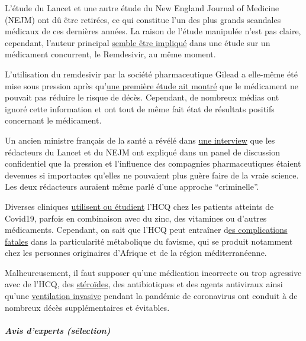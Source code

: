 L'étude du Lancet et une autre étude du New England Journal of Medicine
(NEJM) ont dû être retirées, ce qui constitue l'un des plus grands
scandales médicaux de ces dernières années. La raison de l'étude
manipulée n'est pas claire, cependant, l'auteur principal
\href{https://www.medicineuncensored.com/a-study-out-of-thin-air}{semble
être impliqué} dans une étude sur un médicament concurrent, le
Remdesivir, au même moment.

L'utilisation du remdesivir par la société pharmaceutique Gilead a
elle-même été mise sous pression après
qu'\href{https://edition.cnn.com/2020/05/22/health/remdesivir-covid-19-trial-results-nejm-study/index.html}{une
première étude ait montré} que le médicament ne pouvait pas réduire le
risque de décès. Cependant, de nombreux médias ont ignoré cette
information et ont tout de même fait état de résultats positifs
concernant le médicament.

Un ancien ministre français de la santé a révélé dans
\href{https://www.youtube.com/watch?v=ZYgiCALEdpE}{une interview} que
les rédacteurs du Lancet et du NEJM ont expliqué dans un panel de
discussion confidentiel que la pression et l'influence des compagnies
pharmaceutiques étaient devenues si importantes qu'elles ne pouvaient
plus guère faire de la vraie science. Les deux rédacteurs auraient même
parlé d'une approche ``criminelle''.

Diverses cliniques
\href{https://www.webmd.com/lung/news/20200409/chloroquine-zinc-tested-to-block-covid-infection}{utilisent
ou étudient} l'HCQ chez les patients atteints de Covid19, parfois en
combinaison avec du zinc, des vitamines ou d'autres médicaments.
Cependant, on sait que l'HCQ peut entraîner
d\href{https://off-guardian.org/2020/05/13/covid19-a-case-for-medical-detectives/}{es
complications fatales} dans la particularité métabolique du favisme, qui
se produit notamment chez les personnes originaires d'Afrique et de la
région méditerranéenne.

Malheureusement, il faut supposer qu'une médication incorrecte ou trop
agressive avec de l'HCQ, des
\href{https://www.sciencedaily.com/releases/2020/02/200206110703.htm}{stéroïdes},
des antibiotiques et des agents antiviraux ainsi qu'une
\href{https://nypost.com/2020/05/29/northwell-health-probing-use-of-ventilators-for-covid-patients/}{ventilation
invasive} pendant la pandémie de coronavirus ont conduit à de nombreux
décès supplémentaires et évitables.

\hypertarget{avis-dexperts-suxe9lection}{%
\subparagraph{\texorpdfstring{\textbf{Avis d'experts
(sélection)}}{Avis d'experts (sélection)}}\label{avis-dexperts-suxe9lection}}

